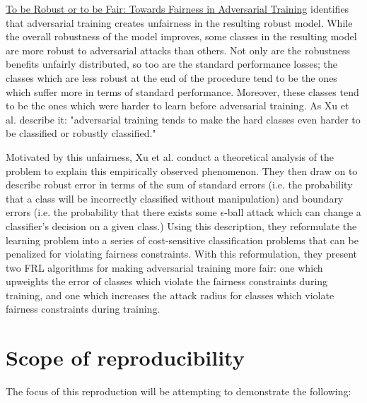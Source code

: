 \href{https://arxiv.org/pdf/2010.06121.pdf}{To be Robust or to be Fair: Towards Fairness in Adversarial Training} \cite{https://doi.org/10.48550/arxiv.2010.06121} identifies that adversarial training creates unfairness in the resulting robust model. While the overall robustness of the model improves, some classes in the resulting model are more robust to adversarial attacks than others. Not only are the robustness benefits unfairly distributed, so too are the standard performance losses; the classes which are less robust at the end of the procedure tend to be the ones which suffer more in terms of standard performance. Moreover, these classes tend to be the ones which were harder to learn before adversarial training. As Xu et al. describe it: "adversarial training tends to make the hard classes even harder to be classified or robustly classified."

Motivated by this unfairness, Xu et al. conduct a theoretical analysis of the problem to explain this empirically observed phenomenon. They then draw on \cite{https://doi.org/10.48550/arxiv.1901.08573} to describe robust error in terms of the sum of standard errors (i.e. the probability that a class will be incorrectly classified without manipulation) and boundary errors (i.e. the  probability that there exists some $\epsilon$-ball attack which can change a classifier's decision on a given class.) Using this description, they reformulate the learning problem into a series of  cost-sensitive classification problems that can be penalized for violating fairness constraints. With this reformulation, they present two FRL algorithms for making adversarial training more fair: one which upweights the error of classes which violate the fairness constraints during training, and one which increases the attack radius for classes which violate fairness constraints during training. 

\section{Scope of reproducibility}
\label{sec:claims}

The focus of this reproduction will be attempting to demonstrate the following: 

